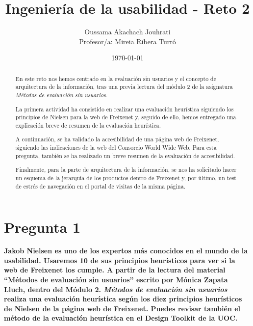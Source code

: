 \documentclass[spanish]{article}
\title{Ingeniería de la usabilidad - Reto 2}
\author{Oussama Akachach Jouhrati\\[0.5cm]{\small Profesor/a: Mireia Ribera Turró}}
\date{\today}
\begin{document}
\maketitle
\newpage

\tableofcontents
{}
\setcounter{page}{2}
\newpage



\begin{abstract}

En este reto nos hemos centrado en la evaluación sin usuarios y el concepto
de arquitectura de la información, tras una previa lectura del
módulo 2 de la asignatura \textit{Métodos de evaluación sin usuarios}.
\newline

La primera actividad ha consistido en realizar una evaluación heurística
siguiendo los principios de Nielsen para la web de Freixenet y, seguido de ello,
hemos entregado una explicación breve de resumen de la evaluación heurística.
\newline

A continuación, se ha validado la accesibilidad de una página web de Freixenet,
siguiendo las indicaciones de la web del Consorcio World Wide Web. Para esta
pregunta, también se ha realizado un breve resumen de la evaluación de
accesibilidad.
\newline

Finalmente, para la parte de arquitectura de la información, se nos ha
solicitado hacer un esquema de la jerarquía de los productos dentro de
Freixenet y, por último, un test de estrés de navegación en el portal de visitas
de la misma página.
\newline

\end{abstract}
\newpage

\section{Pregunta 1}

\textbf{Jakob Nielsen es uno de los expertos más conocidos en el mundo de la
usabilidad. Usaremos 10 de sus principios heurísticos para ver si la web de
Freixenet los cumple. A partir de la lectura del material ``Métodos de
evaluación sin usuarios'' escrito por Mónica Zapata Lluch, dentro del Módulo 2.
\textit{Métodos de evaluación sin usuarios} realiza una evaluación heurística
según los diez principios heurísticos de Nielsen de la página web de Freixenet.
Puedes revisar también el método de la evaluación heurística en el Design
Toolkit de la UOC.}\newline
\end{document}
